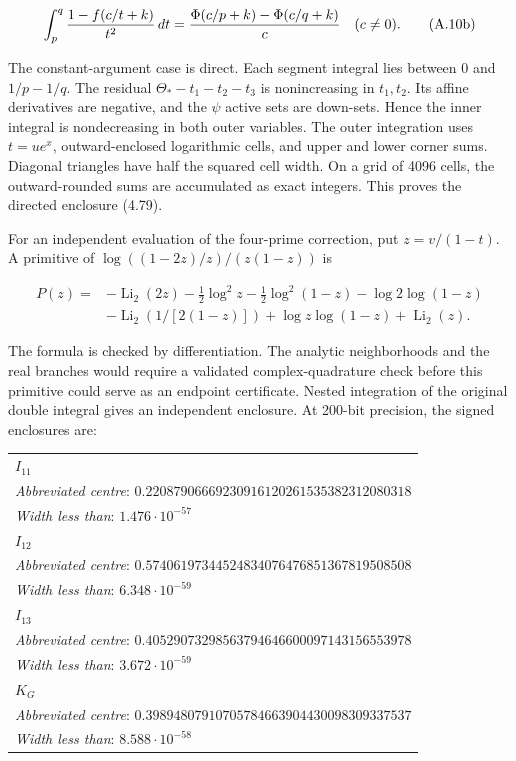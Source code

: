 {\[
 \int_p^q{1-f(c/t+k)\over t^2}\,dt
     ={\Phi(c/p+k)-\Phi(c/q+k)\over c}\quad(c\ne0).
 \tag{A.10b}\label{eq:g1-phi-primitive}
\]

The constant-argument case is direct. Each segment integral lies
between 0 and $1/p-1/q$. The residual
$\Theta_*-t_1-t_2-t_3$ is nonincreasing in $t_1,t_2$.
Its affine derivatives are negative, and the $\psi$ active sets are down-sets.
Hence the inner integral is nondecreasing in both outer variables.
The outer integration uses $t=ue^x$, outward-enclosed logarithmic cells, and upper
and lower corner sums. Diagonal triangles have half the squared cell width.
On a grid of 4096 cells, the outward-rounded sums are accumulated as exact
integers. This proves the directed enclosure (4.79).

For an independent evaluation of the four-prime correction, put
$z=v/(1-t)$. A primitive of
$\log((1-2z)/z)/(z(1-z))$ is

\[
\begin{aligned}
 P(z)={}&-\operatorname{Li}_2(2z)-\tfrac12\log^2z
 -\tfrac12\log^2(1-z)-\log2\log(1-z)\\
 &-\operatorname{Li}_2(1/[2(1-z)])
       +\log z\log(1-z)+\operatorname{Li}_2(z).
\end{aligned}
 \tag{A.10c}\label{eq:g1-dilog-primitive}
\]

The formula is checked by differentiation. The analytic neighborhoods
and the real branches would require a validated complex-quadrature check
before this primitive could serve as an endpoint certificate.
Nested integration of the original double integral gives an
independent enclosure. At 200-bit precision, the signed enclosures are:

{
\normalsize
\setlength{\tabcolsep}{3pt}
\begin{longtable}{@{}p{\textwidth}@{}}
\toprule
\textbf{$I_{11}$} \\
\emph{Abbreviated centre}: $0.22087906669230916120261535382312080318$ \\
\emph{Width less than}: $1.476\cdot10^{-57}$ \\
\midrule
\textbf{$I_{12}$} \\
\emph{Abbreviated centre}: $0.57406197344524834076476851367819508508$ \\
\emph{Width less than}: $6.348\cdot10^{-59}$ \\
\midrule
\textbf{$I_{13}$} \\
\emph{Abbreviated centre}: $0.40529073298563794646600097143156553978$ \\
\emph{Width less than}: $3.672\cdot10^{-59}$ \\
\midrule
\textbf{$K_G$} \\
\emph{Abbreviated centre}: $0.39894807910705784663904430098309337537$ \\
\emph{Width less than}: $8.588\cdot10^{-58}$ \\


\end{longtable}}}

